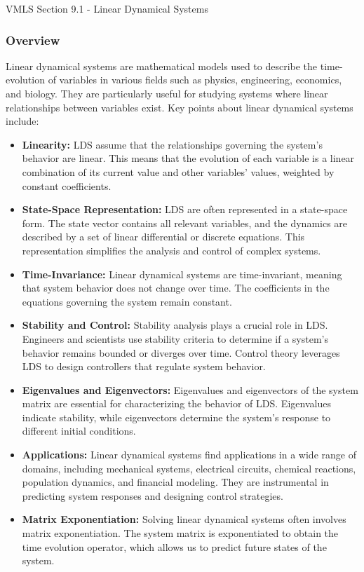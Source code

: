 \begin{notes}{VMLS Section 9.1 - Linear Dynamical Systems}
    \subsubsection*{Overview}

    Linear dynamical systems are mathematical models used to describe the time-evolution of variables in various fields such as physics, engineering, economics, and biology. They are particularly useful 
    for studying systems where linear relationships between variables exist. Key points about linear dynamical systems include:

    \begin{itemize}
        \item \textbf{Linearity:} LDS assume that the relationships governing the system's behavior are linear. This means that the evolution of each variable is a linear combination of its current value 
        and other variables' values, weighted by constant coefficients.
        \item \textbf{State-Space Representation:} LDS are often represented in a state-space form. The state vector contains all relevant variables, and the dynamics are described by a set of linear 
        differential or discrete equations. This representation simplifies the analysis and control of complex systems.
        \item \textbf{Time-Invariance:} Linear dynamical systems are time-invariant, meaning that system behavior does not change over time. The coefficients in the equations governing the system remain 
        constant.
        \item \textbf{Stability and Control:} Stability analysis plays a crucial role in LDS. Engineers and scientists use stability criteria to determine if a system's behavior remains bounded or diverges 
        over time. Control theory leverages LDS to design controllers that regulate system behavior.
        \item \textbf{Eigenvalues and Eigenvectors:} Eigenvalues and eigenvectors of the system matrix are essential for characterizing the behavior of LDS. Eigenvalues indicate stability, while 
        eigenvectors determine the system's response to different initial conditions.
        \item \textbf{Applications:} Linear dynamical systems find applications in a wide range of domains, including mechanical systems, electrical circuits, chemical reactions, population dynamics, 
        and financial modeling. They are instrumental in predicting system responses and designing control strategies.
        \item \textbf{Matrix Exponentiation:} Solving linear dynamical systems often involves matrix exponentiation. The system matrix is exponentiated to obtain the time evolution operator, which allows 
        us to predict future states of the system.
    \end{itemize}
    

\end{notes}
